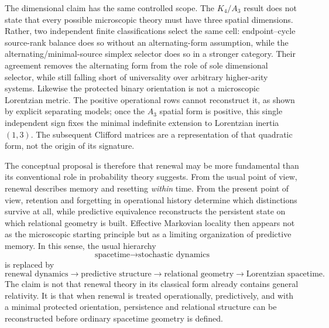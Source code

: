 \documentclass[11pt]{article}
\theoremstyle{definition}
\theoremstyle{remark}
\begin{document}
The dimensional claim has the same controlled scope.  The $K_4/A_3$ result
does not state that every possible microscopic theory must have three spatial
dimensions.  Rather, two independent finite classifications select the same
cell: endpoint--cycle source-rank balance does so without an alternating-form
assumption, while the alternating/minimal-source simplex selector does so in a
stronger category.  Their agreement removes the alternating form from the role
of sole dimensional selector, while still falling short of universality over
arbitrary higher-arity systems.  Likewise the protected binary orientation is
not a microscopic Lorentzian metric.  The positive operational rows cannot
reconstruct it, as shown by explicit separating models; once the $A_3$ spatial
form is positive, this single independent sign fixes the minimal indefinite
extension to Lorentzian inertia $(1,3)$.  The subsequent Clifford matrices are
a representation of that quadratic form, not the origin of its signature.

The conceptual proposal is therefore that renewal may be more fundamental
than its conventional role in probability theory suggests.  From the usual
point of view, renewal describes memory and resetting \emph{within} time.  From
the present point of view, retention and forgetting in operational history
determine which distinctions survive at all, while predictive equivalence
reconstructs the persistent state on which relational geometry is built.
Effective Markovian locality then appears not as the microscopic starting
principle but as a limiting organization of predictive memory.  In this sense,
the usual hierarchy
\begin{equation}
\boxed{\text{spacetime}\longrightarrow\text{stochastic dynamics}}
\end{equation}
is replaced by
\begin{equation}
\boxed{
\text{renewal dynamics}
\longrightarrow
\text{predictive structure}
\longrightarrow
\text{relational geometry}
\longrightarrow
\text{Lorentzian spacetime}.}
\end{equation}
The claim is not that renewal theory in its classical form already contains
general relativity.  It is that when renewal is treated operationally,
predictively, and with a minimal protected orientation, persistence and
relational structure can be reconstructed before ordinary spacetime geometry
is defined.
\end{document}
